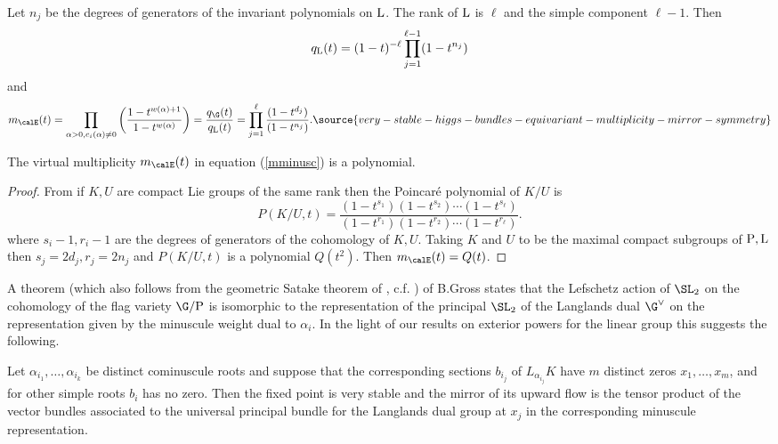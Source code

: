 Let $n_j$ be the degrees of  generators of the invariant polynomials on $\rm L$. The rank of $\rm L$ is $\ell$ and the simple component $\ell-1$.  Then
$$q_{\rm L}(t)=(1-t)^{-{\ell}}  \prod_{j=1}^{\ell-1}(1-t^{n_j})$$
and
\begin{equation}
m_\calE(t)=\prod_{\alpha>0, c_i(\alpha)\ne 0}\left(\frac{1-t^{w(\alpha)+1}}{1-t^{w(\alpha)}}\right)=\frac{q_\G(t)}{q_{\rm L}(t)}= \prod_{j=1}^{\ell}\frac{(1-t^{d_j})}{(1-t^{n_j})}.
\label{mminusc}
\source{very-stable-higgs-bundles-equivariant-multiplicity-mirror-symmetry}
\end{equation}
\begin{proposition}
\notready \label{cominint} The virtual multiplicity $m_\calE(t)$ in equation (\ref{mminusc}) is a polynomial.
\end{proposition}
\begin{proof} From \cite[Theorem 26.1]{Borel}  if $K,U$ are compact Lie groups of the same rank then the Poincar\'e polynomial of $K/U$ is
	$$P(K/U,t)=\frac{(1-t^{s_1})(1-t^{s_2})\cdots (1-t^{s_{\ell}})}{(1-t^{r_1})(1-t^{r_2})\cdots (1-t^{r_{\ell}})}.$$
	where $s_i-1, r_i-1$ are the degrees of generators of the cohomology of $K,U$. Taking $K$ and $U$ to be the maximal compact subgroups of ${\rm P},{\rm L}$ then $s_j=2d_j, r_j=2n_j$ and   $P(K/U,t)$ is a polynomial $Q(t^2)$. Then $m_\calE(t)=Q(t)$.
\end{proof}
A theorem (which also follows from the geometric Satake theorem of \cite{mirkovic-villonen}, c.f. \cite[Theorem 1.6.3]{ginzburg}) of B.Gross \cite[Corollary 6.4]{Gross}  states that the Lefschetz action of $\SL_2$ on the cohomology of the flag variety $\G/{\rm P}$ is isomorphic to the representation of the principal $\SL_2$ of the Langlands dual $\G^{\vee}$ on the  representation given by the minuscule weight dual to $\alpha_i$. In the light of our results on exterior powers for the linear group this suggests the following.

\begin{conjecture}
\notready  \label{cominmirror} Let $\alpha_{i_1},\dots,\alpha_{i_k}$ be distinct cominuscule roots and suppose that the corresponding sections $b_{i_j}$ of $L_{\alpha_{i_j}}K$ have $m$ distinct zeros $x_1,\dots, x_m$, and for other simple roots $b_i$ has no zero.
	Then the fixed point  is very stable and the mirror of its upward flow is the tensor product of the vector bundles associated to the universal principal bundle for the Langlands dual group at $x_j$ in the corresponding minuscule representation. \end{conjecture}

